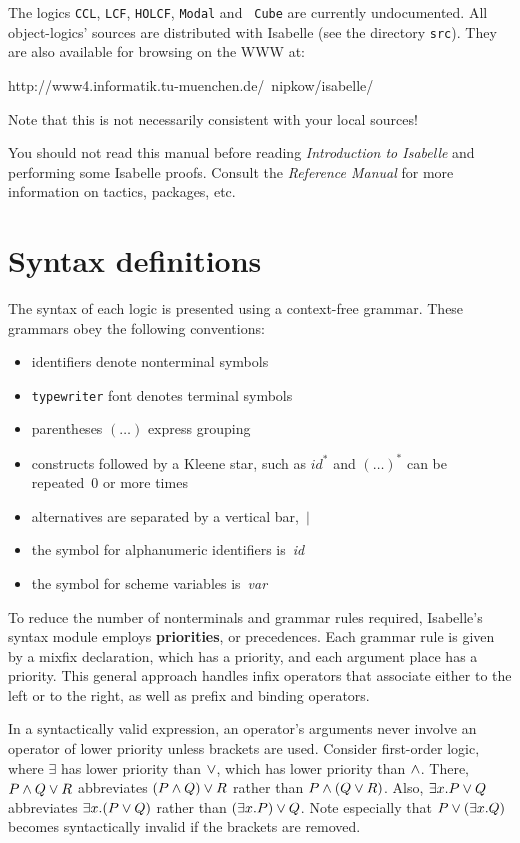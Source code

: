 The logics {\tt CCL}, {\tt LCF}, {\tt HOLCF}, {\tt Modal} and {\tt
  Cube} are currently undocumented. All object-logics' sources are
distributed with Isabelle (see the directory \texttt{src}).  They are
also available for browsing on the WWW at:
\begin{ttbox}
http://www4.informatik.tu-muenchen.de/~nipkow/isabelle/
\end{ttbox}
Note that this is not necessarily consistent with your local sources!

\medskip You should not read this manual before reading {\em
  Introduction to Isabelle\/} and performing some Isabelle proofs.
Consult the {\em Reference Manual} for more information on tactics,
packages, etc.


\section{Syntax definitions}
The syntax of each logic is presented using a context-free grammar.
These grammars obey the following conventions:
\begin{itemize}
\item identifiers denote nonterminal symbols
\item {\tt typewriter} font denotes terminal symbols
\item parentheses $(\ldots)$ express grouping
\item constructs followed by a Kleene star, such as $id^*$ and $(\ldots)^*$
can be repeated~0 or more times 
\item alternatives are separated by a vertical bar,~$|$
\item the symbol for alphanumeric identifiers is~{\it id\/} 
\item the symbol for scheme variables is~{\it var}
\end{itemize}
To reduce the number of nonterminals and grammar rules required, Isabelle's
syntax module employs {\bf priorities}, or precedences.
Each grammar rule is given by a mixfix declaration, which has a priority,
and each argument place has a priority.  This general approach handles
infix operators that associate either to the left or to the right, as well
as prefix and binding operators.

In a syntactically valid expression, an operator's arguments never involve
an operator of lower priority unless brackets are used.  Consider
first-order logic, where $\exists$ has lower priority than $\vee$,
which has lower priority than $\wedge$.  There, $P\wedge Q \vee R$
abbreviates $(P\wedge Q) \vee R$ rather than $P\wedge (Q\vee R)$.  Also,
$\exists x.P\vee Q$ abbreviates $\exists x.(P\vee Q)$ rather than
$(\exists x.P)\vee Q$.  Note especially that $P\vee(\exists x.Q)$
becomes syntactically invalid if the brackets are removed.

